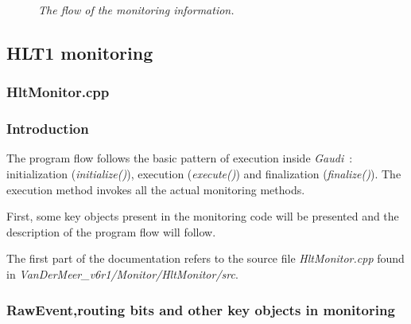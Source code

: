 \begin{figure}
\caption{\textit{The flow of the monitoring information.}\cite{Callot:1177133}}
\centering
{}\par
\end{figure}


\subsection{\textbf{HLT1 monitoring}}

\subsubsection{\textbf{HltMonitor.cpp}}
\subsubsection{\textbf{Introduction}}
The program flow follows the basic pattern of execution inside \textit{Gaudi}~:
initialization (\textit{initialize()}), execution ({\textit{execute()}}) and finalization ({\textit{finalize()}}). The execution method invokes all the actual monitoring methods.\par
First, some key objects present in the monitoring code will be presented and the description of the program flow will follow.\par
The first part of the documentation refers to the source file \textit{HltMonitor.cpp} found in \textit{VanDerMeer\_v6r1/Monitor/HltMonitor/src}.

\subsubsection{\textbf{RawEvent,routing bits and other key objects in monitoring}}

